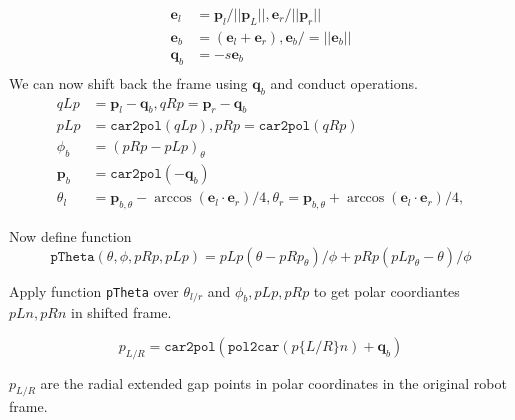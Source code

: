 \documentclass[11pt, letter]{article}
\newcommand{\ev}{\mathbf{e}}
\newcommand{\qv}{\mathbf{q}}
\newcommand{\pv}{\mathbf{p}}
\begin{document}
    \begin{equation*}
        \begin{split}
            \ev_l & = \pv_l / ||\pv_L||, \ev_r / ||\pv_r||\\
            \ev_b & = (\ev_l + \ev_r), \ev_b /= ||\ev_b||\\
            \qv_b & = -s \ev_b\\
        \end{split}
    \end{equation*}
    We can now shift back the frame using $\qv_b$ and conduct operations.
    \begin{equation*}
        \begin{split}
            qLp & = \pv_l - \qv_b, qRp = \pv_r - \qv_b\\
            pLp & = \texttt{car2pol}(qLp), pRp = \texttt{car2pol}(qRp)\\
            \phi_b & = (pRp - pLp)_{\theta}\\
            \pv_b & = \texttt{car2pol}(-\qv_b)\\
            \theta_l & = \pv_{b,\theta} - \arccos(\ev_l \cdot \ev_r) / 4, 
            \theta_r =   \pv_{b,\theta} + \arccos(\ev_l \cdot \ev_r) / 4, 
        \end{split}
    \end{equation*}

    Now define function
    \begin{equation*}
        \texttt{pTheta}(\theta, \phi, pRp, pLp) = 
        pLp (\theta - pRp_\theta) / \phi + pRp (pLp_\theta - \theta) / \phi
    \end{equation*}

    Apply function \texttt{pTheta} over $\theta_{l/r}$ and $\phi_b, pLp, pRp$
    to get polar coordiantes $pLn, pRn$ in shifted frame.
    
    \begin{equation*}
        p_{L/R} = \texttt{car2pol}(\texttt{pol2car}(p\{L/R\}n) + \qv_b)
    \end{equation*}

    $p_{L/R}$ are the radial extended gap points in polar coordinates in the
    original robot frame.
    
\end{document}
